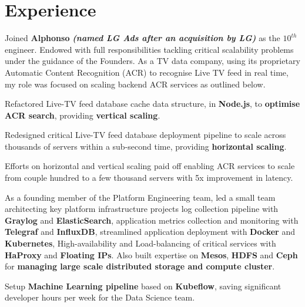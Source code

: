 \documentclass[]{deedy-resume-openfont}
\begin{document}
\begin{minipage}[t]{0.66\textwidth} 


\section{Experience}
\vspace{\topsep} %
\begin{tightemize}
\item Joined \textbf{Alphonso} {\footnotesize \textit{\textbf{(named LG Ads after an acquisition by LG) }}} as the $10^{th}$ engineer. Endowed with full responsibilities tackling critical scalability problems under the guidance of the Founders. As a TV data company, using its proprietary Automatic Content Recognition (ACR) to recognise Live TV feed in real time, my role was focused on scaling backend ACR services as outlined below.
\item Refactored Live-TV feed database cache data structure, in \textbf{Node.js}, to \textbf{optimise ACR search}, providing \textbf{vertical scaling}.
\item Redesigned critical Live-TV feed database deployment pipeline to scale across thousands of servers within a sub-second time, providing \textbf{horizontal scaling}.
\item Efforts on horizontal and vertical scaling paid off enabling ACR services to scale from couple hundred to a few thousand servers with 5x improvement in latency.
\item As a founding member of the Platform Engineering team, led a small team architecting key platform infrastructure projects \textemdash log collection pipeline with \textbf{Graylog} and \textbf{ElasticSearch}, application metrics collection and monitoring with \textbf{Telegraf} and \textbf{InfluxDB}, streamlined application deployment with \textbf{Docker} and \textbf{Kubernetes}, High-availability and Load-balancing of critical services with \textbf{HaProxy} and \textbf{Floating IPs}. Also built expertise on \textbf{Mesos}, \textbf{HDFS} and \textbf{Ceph} for \textbf{managing large scale distributed storage and compute cluster}.
\item Setup \textbf{Machine Learning pipeline} based on \textbf{Kubeflow}, saving significant developer hours per week for the Data Science team.
\end{tightemize}
\sectionsep


\end{minipage}
\end{document}
